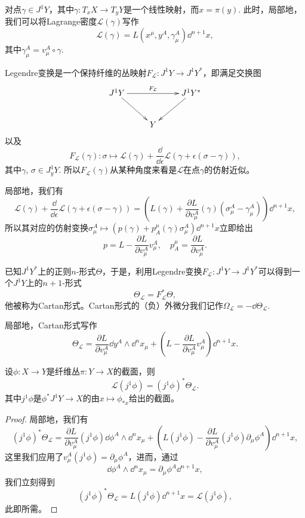 对点$\gamma\in J^1Y$，其中$\gamma:T_xX\to T_yY$是一个线性映射，而$x=\pi(y)$. 此时，局部地，我们可以将Lagrange密度$\mathcal{L}(\gamma)$写作
\[
    \mathcal{L}(\gamma)=L\left(x^\mu,y^A,\gamma^A_\mu\right)\dd^{n+1}x,
\]
其中$\gamma^A_\mu=v^A_\mu\circ \gamma$.

\begin{para}[Legendre变换]
    Legendre变换是一个保持纤维的丛映射$F_{\mathcal L}:J^1Y\to J^1Y^*$，即满足交换图
    \[
        \xymatrix{
        J^1Y\ar[dr]\ar[rr]^-{F_{\mathcal L}}&&J^1Y^*\ar[dl]\\
        &Y&
        }
    \]
    以及
    \[
        F_{\mathcal L}(\gamma):\sigma\mapsto\mathcal{L}(\gamma)+\frac{\dd}{\dd \epsilon}\mathcal L(\gamma+\epsilon(\sigma-\gamma)),
    \]
    其中$\gamma$, $\sigma\in J^1_yY$. 所以$F_{\mathcal L}(\gamma)$从某种角度来看是$\mathcal L$在点$\gamma$的仿射近似。
\end{para}

局部地，我们有
\[
    \mathcal{L}(\gamma)+\frac{\dd}{\dd \epsilon}\mathcal L(\gamma+\epsilon(\sigma-\gamma))=\left(L(\gamma)+\frac{\partial L}{\partial v^A_\mu}(\gamma)(\sigma^A_\mu-\gamma^A_\mu)\right)\dd^{n+1}x,
\]
所以其对应的仿射变换$\sigma^A_\mu\mapsto (p(\gamma)+p_A^\mu(\gamma) \sigma^A_\mu)\dd^{n+1}x$立即给出
\[
    p=L-\frac{\partial L}{\partial v^A_\mu}v^A_\mu,\quad p^\mu_A=\frac{\partial L}{\partial v^A_\mu}.
\]

\begin{para}[Cartan形式]
    已知$J^1Y^*$上的正则$n$-形式$\Theta$，于是，利用Legendre变换$F_{\mathcal L}:J^1Y\to J^1Y^*$可以得到一个$J^1Y$上的$n+1$-形式
    \[
        \Theta_{\mathcal L}=F_{\mathcal L}^*\Theta,
    \]
    他被称为Cartan形式。Cartan形式的（负）外微分我们记作$\Omega_{\mathcal L}=-\dd \Theta_{\mathcal L}$.
\end{para}

局部地，Cartan形式写作
\[
    \Theta_{\mathcal L}=\frac{\partial L}{\partial v^A_\mu}\dd y^A\wedge \dd^{n}x_\mu + \left(L-\frac{\partial L}{\partial v^A_\mu}v^A_\mu\right)\dd^{n+1} x.
\]

\begin{pro}\label{pro:1.17}
    设$\phi:X\to Y$是纤维丛$\pi:Y\to X$的截面，则
    \[
        \mathcal L(j^1\phi)=(j^1\phi)^*\Theta_{\mathcal L}.
    \]
    其中$j^1\phi$是$\phi^*J^1Y\to X$的由$x\mapsto \phi_{*x}$给出的截面。
\end{pro}

\begin{proof}
    局部地，我们有
    \[
        (j^1\phi)^*\Theta_{\mathcal L}=\frac{\partial L}{\partial v^A_\mu}(j^1\phi)\dd \phi^A\wedge \dd^{n}x_\mu + \left(L(j^1\phi)-\frac{\partial L}{\partial v^A_\mu}(j^1\phi)\partial_\mu \phi^A\right)\dd^{n+1} x,
    \]
    这里我们应用了$v_\mu^A(j^1\phi)=\partial_\mu\phi^A$，进而，通过
    \[
        \dd \phi^A\wedge \dd^{n}x_\mu=\partial_\mu \phi^A\dd^{n+1} x,
    \]
    我们立刻得到
    \[
        (j^1\phi)^*\Theta_{\mathcal L}=L(j^1\phi)\dd^{n+1} x=\mathcal L(j^1\phi),
    \]
    此即所需。
\end{proof}

